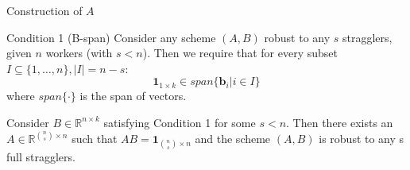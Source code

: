 \documentclass{beamer}
\begin{document}
\begin{frame}{Construction of $A$}

\begin{block}{Condition 1 (B-span)}
    Consider any scheme $(A, B)$ robust to any $s$ stragglers, given $n$ workers (with $s < n$). Then we require that for every subset $I \subseteq \{1, \dots, n\}, \lvert I \rvert = n - s$:
    \[\boldsymbol{1}_{1\times k} \in span\{\boldsymbol{b}_i \vert i \in I\}\]
    where $span\{·\}$ is the span of vectors.
\end{block}

\begin{lemma}
    Consider $B \in \mathbb{R}^{n\times k}$ satisfying Condition 1 for some $s < n$. Then there exists an $A \in \mathbb{R}^{\binom{n}{s}\times n}$ such that $AB = \boldsymbol{1}_{\binom{n}{s}\times n}$ and the scheme $(A, B)$ is robust to any s full stragglers.
\end{lemma}

\end{frame}
\end{document}
